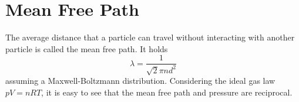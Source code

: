 \section{Mean Free Path}
The average distance that a particle can travel without interacting with another particle is called the mean free path.
It holds
\begin{equation}
	\lambda=\frac{1}{\sqrt{2}\pi n d^2}
\end{equation}
assuming a Maxwell-Boltzmann distribution.
Considering the ideal gas law $pV=nRT$, it is easy to see that the mean free path and pressure are reciprocal.
